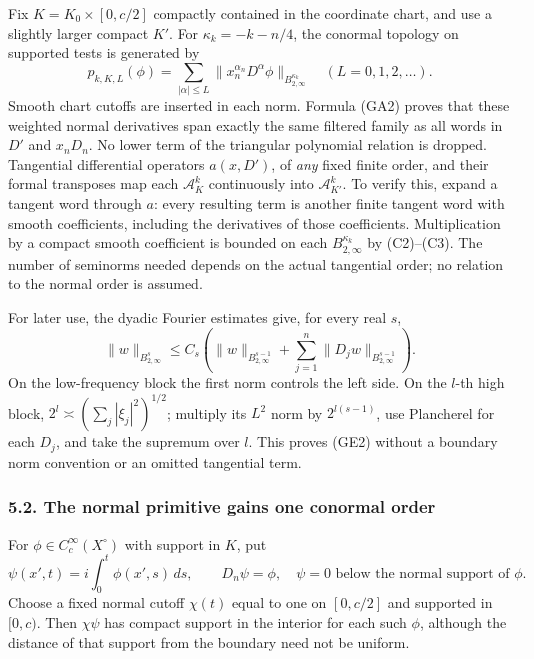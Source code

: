\documentclass[
  11pt,
]{article}
\begin{document}
Fix \(K=K_0\times[0,c/2]\) compactly contained in the coordinate chart,
and use a slightly larger compact \(K'\). For \(\kappa_k=-k-n/4\), the
conormal topology on supported tests is generated by \[
 p_{k,K,L}(\phi)
 =\sum_{|\alpha|\le L}
       \|x_n^{\alpha_n}D^\alpha\phi\|_{B^{\kappa_k}_{2,\infty}}
 \quad(L=0,1,2,\ldots).
 \tag{GE1}
\] Smooth chart cutoffs are inserted in each norm. Formula (GA2) proves
that these weighted normal derivatives span exactly the same filtered
family as all words in \(D'\) and \(x_nD_n\). No lower term of the
triangular polynomial relation is dropped. Tangential differential
operators \(a(x,D')\), of \emph{any} fixed finite order, and their
formal transposes map each \(\mathcal A^k_K\) continuously into
\(\mathcal A^k_{K'}\). To verify this, expand a tangent word through
\(a\): every resulting term is another finite tangent word with smooth
coefficients, including the derivatives of those coefficients.
Multiplication by a compact smooth coefficient is bounded on each
\(B^{\kappa_k}_{2,\infty}\) by (C2)--(C3). The number of seminorms
needed depends on the actual tangential order; no relation to the normal
order is assumed.

For later use, the dyadic Fourier estimates give, for every real \(s\),
\[
 \|w\|_{B^s_{2,\infty}}
 \le C_s\left(\|w\|_{B^{s-1}_{2,\infty}}
       +\sum_{j=1}^{n}\|D_jw\|_{B^{s-1}_{2,\infty}}\right).
 \tag{GE2}
\] On the low-frequency block the first norm controls the left side. On
the \(l\)-th high block, \(2^l\asymp(\sum_j|\xi_j|^2)^{1/2}\); multiply
its \(L^2\) norm by \(2^{l(s-1)}\), use Plancherel for each \(D_j\), and
take the supremum over \(l\). This proves (GE2) without a boundary norm
convention or an omitted tangential term.

\subsubsection{5.2. The normal primitive gains one conormal
order}\label{the-normal-primitive-gains-one-conormal-order}

For \(\phi\in C_c^\infty(X^\circ)\) with support in \(K\), put \[
 \psi(x',t)=i\int_0^t\phi(x',s)\,ds,
 \qquad D_n\psi=\phi,
 \quad \psi=0\text{ below the normal support of }\phi.
 \tag{GE3}
\] Choose a fixed normal cutoff \(\chi(t)\) equal to one on \([0,c/2]\)
and supported in \([0,c)\). Then \(\chi\psi\) has compact support in the
interior for each such \(\phi\), although the distance of that support
from the boundary need not be uniform.
\end{document}
